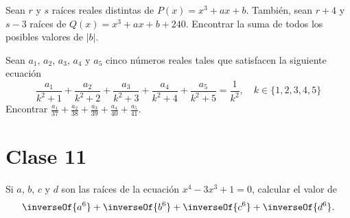 \begin{problem}
    Sean $r$ y $s$ raíces reales distintas de $P(x) = x^3 + ax + b$.
    También, sean $r + 4$ y $s - 3$ raíces de $Q(x) = x^3 + ax + b + 240$.
    Encontrar la suma de todos los posibles valores de $|b|$.
\end{problem}

\begin{problem}
    Sean $a_1$, $a_2$, $a_3$, $a_4$ y $a_5$ cinco números reales tales que satisfacen la siguiente ecuación
    \[\frac{a_1}{k^2 + 1} + \frac{a_2}{k^2 + 2} + \frac{a_3}{k^2 + 3} + \frac{a_4}{k^2 + 4} + \frac{a_5}{k^2 + 5} = \frac{1}{k^2}, \quad k \in \{1, 2, 3, 4, 5\}\]
    Encontrar $\frac{a_1}{37} + \frac{a_2}{38} + \frac{a_3}{39} + \frac{a_4}{40} + \frac{a_5}{41}$.
\end{problem}

\section{Clase 11}

    \begin{problem}
        Si $a$, $b$, $c$ y $d$ son las raíces de la ecuación $x^4 - 3x^3 + 1 = 0$,
        calcular el valor de
        \[\inverseOf{a^6} + \inverseOf{b^6} + \inverseOf{c^6} + \inverseOf{d^6}.\]
    \end{problem}